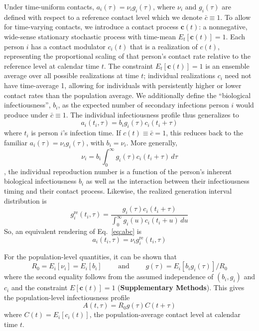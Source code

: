 Under time-uniform contacts, $a_i(\tau) = \nu_i g_i(\tau)$, where $\nu_i$ and $g_i(\tau)$ are defined with respect to a reference contact level which we denote $\bar{c} \equiv 1$. To allow for time-varying contacts, we introduce a contact process $\mathbf{c}(t)$: a nonnegative, wide-sense stationary stochastic process with time-mean $E_t[\mathbf{c}(t)] = 1$. Each person $i$ has a contact modulator $c_i(t)$ that is a realization of $c(t)$, representing the proportional scaling of that person's contact rate relative to the reference level at calendar time $t$. The constraint $E_t[\mathbf{c}(t)] = 1$ is an ensemble average over all possible realizations at time $t$; individual realizations $c_i$ need not have time-average 1, allowing for individuals with persistently higher or lower contact rates than the population average. We additionally define the ``biological infectiousness'', $b_i$, as the expected number of secondary infections person $i$ would produce under $\bar{c} \equiv 1$. The individual infectiousness profile thus generalizes to 
%
\begin{equation}
	a_i(t_i, \tau) = b_i g_i(\tau) c_i(t_i + \tau) 
	\label{eq:abc}
\end{equation}
% 
where $t_i$ is person $i$'s infection time. If $c(t) \equiv \bar{c} = 1$, this reduces back to the familiar $a_i(\tau) = \nu_i g_i(\tau)$, with $b_i = \nu_i$. More generally, 
%
\begin{equation}
	\nu_i = b_i \int_0^\infty g_i(\tau) c_i(t_i+\tau) \, d\tau
	\label{eq:nu_general}
\end{equation}
%
\ie, the individual reproduction number is a function of the person's inherent biological infectiousness $b_i$ as well as the interaction between their infectiousness timing and their contact process. Likewise, the realized generation interval distribution is 
%
\begin{equation}
	g_i^\text{re}(t_i, \tau) = \frac{
		g_i(\tau) c_i(t_i + \tau)
	}{
		\int_0^\infty g_i(u) c_i(t_i + u)\, du
	}
\end{equation}
%
So, an equivalent rendering of Eq.~\ref{eq:abc} is 
%
\begin{equation}
	a_i(t_i, \tau) = \nu_i g_i^\text{re}(t_i, \tau)
\end{equation}
%

For the population-level quantities, it can be shown that 
\begin{equation}
	R_0 = E_i[\nu_i] = E_i[b_i] \qquad \text{ and } \qquad g(\tau) = E_i[b_i g_i(\tau)] / R_0
\end{equation}
where the second equality follows from the assumed independence of $(b_i, g_i)$ and $c_i$ and the constraint $E[\mathbf{c}(t)] = 1$ ({\bf Supplementary Methods}). This gives the population-level infectiousness profile 
\begin{equation}
	A(t, \tau) = R_0 g(\tau) C(t + \tau)
\end{equation}
where $C(t) = E_i[c_i(t)]$, the population-average contact level at calendar time $t$. 

